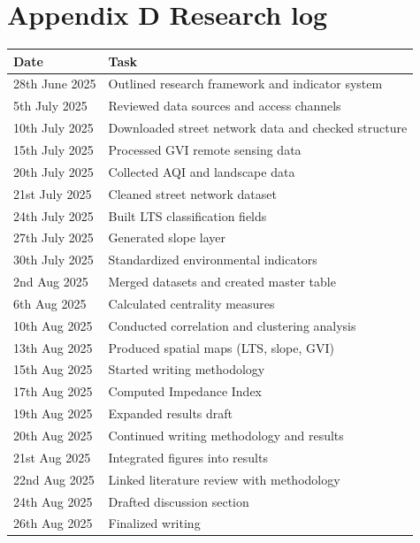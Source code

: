\documentclass[
  12pt,
  oneside]{book}
\begin{document}
\clearpage

\section*{Appendix D Research log}\label{appendix-d-research-log}

\begin{table}
\centering
\begin{tabular}{ll}
\toprule
\textbf{Date} & \textbf{Task}\\
\midrule
28th June 2025 & Outlined research framework and indicator system\\
5th July 2025 & Reviewed data sources and access channels\\
10th July 2025 & Downloaded street network data and checked structure\\
15th July 2025 & Processed GVI remote sensing data\\
20th July 2025 & Collected AQI and landscape data\\
\addlinespace
21st July 2025 & Cleaned street network dataset\\
24th July 2025 & Built LTS classification fields\\
27th July 2025 & Generated slope layer\\
30th July 2025 & Standardized environmental indicators\\
2nd Aug 2025 & Merged datasets and created master table\\
\addlinespace
6th Aug 2025 & Calculated centrality measures\\
10th Aug 2025 & Conducted correlation and clustering analysis\\
13th Aug 2025 & Produced spatial maps (LTS, slope, GVI)\\
15th Aug 2025 & Started writing methodology\\
17th Aug 2025 & Computed Impedance Index\\
\addlinespace
19th Aug 2025 & Expanded results draft\\
20th Aug 2025 & Continued writing methodology and results\\
21st Aug 2025 & Integrated figures into results\\
22nd Aug 2025 & Linked literature review with methodology\\
24th Aug 2025 & Drafted discussion section\\
\addlinespace
26th Aug 2025 & Finalized writing\\
\bottomrule
\end{tabular}
\end{table}

\enddocument

\printbibliography
\end{document}
